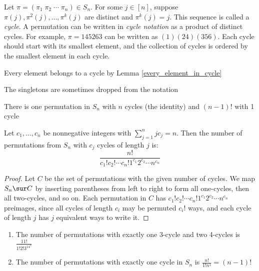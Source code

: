 \documentclass[a4paper]{article}
\begin{document}
\begin{definition}
Let $\pi=(\pi_1\;\pi_2\;\cdots\;\pi_n)\in S_n$. For some $j\in[n]$, suppose $\pi(j),\pi^2(j),\dots,\pi^k(j)$ are distinct and $\pi^k(j)=j$. This sequence is called a \emph{cycle}. A permutation can be written in \emph{cycle notation} as a product of distinct cycles. For example, $\pi=145263$ can be written as $(1)(24)(356)$. Each cycle should start with its smallest element, and the collection of cycles is ordered by the smallest element in each cycle.
\begin{arrows}
\item Every element belongs to a cycle by Lemma \ref{every_element_in_cycle}
\item The singletons are sometimes dropped from the notation
\item There is one permutation in $S_n$ with $n$ cycles (the identity) and $(n-1)!$ with 1 cycle
\end{arrows}
\end{definition}

\begin{theorem}
Let $c_1,\dots,c_n$ be nonnegative integers with $\sum_{j=1}^njc_j=n$. Then the number of permutations from $S_n$ with $c_j$ cycles of length $j$ is:
\begin{equation*}
\frac{n!}{c_1!c_2!\cdots c_n!1^{c_1}2^{c_2}\cdots n^{c_n}}
\end{equation*}

\begin{hl}
\begin{proof}
Let $C$ be the set of permutations with the given number of cycles. We map $S_n\sur C$ by inserting parentheses from left to right to form all one-cycles, then all two-cycles, and so on. Each permutation in $C$ has $c_1!c_2!\cdots c_n!1^{c_1}2^{c_2}\cdots n^{c_n}$ preimages, since all cycles of length $c_i$ may be permuted $c_i!$ ways, and each cycle of length $j$ has $j$ equivalent ways to write it.
\end{proof}
\end{hl}
\end{theorem}

\begin{example}
\;
\begin{enumerate}
\item The number of permutations with exactly one 3-cycle and two 4-cycles is $\frac{11!}{1!2!3^14^2}$
\item The number of permutations with exactly one cycle in $S_n$ is $\frac{n!}{1!n^1}=(n-1)!$
\end{enumerate}
\end{example}
\end{document}
